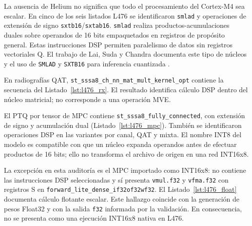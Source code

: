 La ausencia de Helium no significa que todo el procesamiento del Cortex-M4 sea escalar. En cinco de los seis listados L476 se identificaron \texttt{smlad} y operaciones de extensión de signo \texttt{sxtb16}/\texttt{sxtab16}. \texttt{smlad} realiza productos-acumulaciones duales sobre operandos de 16 bits empaquetados en registros de propósito general. Estas instrucciones DSP permiten paralelismo de datos sin registros vectoriales Q. El trabajo de Lai, Suda y Chandra documenta este tipo de núcleos y el uso de \texttt{SMLAD} y \texttt{SXTB16} para inferencia cuantizada \cite{lai2018}.

En radiografías QAT, \texttt{st\_\allowbreak sssa8\_\allowbreak ch\_\allowbreak nn\_\allowbreak mat\_\allowbreak mult\_\allowbreak kernel\_\allowbreak opt} contiene la secuencia del Listado~\ref{lst:l476_rx}. El resultado identifica cálculo DSP dentro del núcleo matricial; no corresponde a una operación MVE.

\noindent\begin{minipage}{\linewidth}

\end{minipage}

El PTQ por tensor de MPC contiene \texttt{st\_\allowbreak sssa8\_\allowbreak fully\_\allowbreak connected}, con extensión de signo y acumulación dual (Listado~\ref{lst:l476_mpc}). También se identificaron operaciones DSP en las variantes por canal, QAT y mixta. El nombre INT8 del modelo es compatible con que un núcleo expanda operandos antes de efectuar productos de 16 bits; ello no transforma el archivo de origen en una red INT16x8.

\noindent\begin{minipage}{\linewidth}

\end{minipage}

La excepción en esta auditoría es el MPC importado como INT16x8: no contiene las instrucciones DSP seleccionadas y sí presenta \texttt{vmul.f32} y \texttt{vfma.f32} con registros S en \texttt{forward\_\allowbreak lite\_\allowbreak dense\_\allowbreak if32of32wf32}. El Listado~\ref{lst:l476_float} documenta cálculo flotante escalar. Este hallazgo coincide con la generación de pesos Float32 y con la salida \texttt{f32} informada por la validación. En consecuencia, no se presenta como una ejecución INT16x8 nativa en L476.

